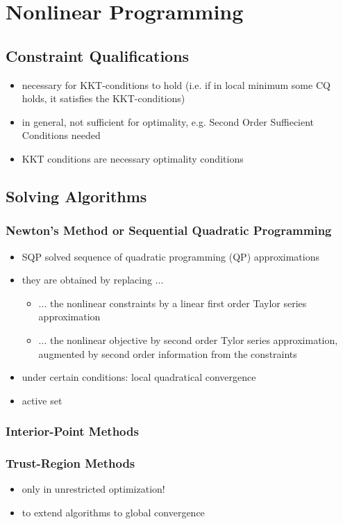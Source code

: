 \documentclass{article}
\begin{document}
\section{Nonlinear Programming}
\subsection{Constraint Qualifications}
\begin{itemize}
\item necessary for KKT-conditions to hold (i.e. if in local minimum some CQ holds, it satisfies the KKT-conditions)
\item in general, not sufficient for optimality, e.g. Second Order Suffiecient Conditions needed
\item KKT conditions are necessary optimality conditions
\end{itemize}

\subsection{Solving Algorithms}
\subsubsection{Newton's Method or Sequential Quadratic Programming}
\begin{itemize}
\item SQP solved sequence of quadratic programming (QP) approximations 
\item they are obtained by replacing ...
	\begin{itemize}
	\item ... the nonlinear constraints by a linear first order Taylor series approximation
	\item ... the nonlinear objective by second order Tylor series approximation, augmented by second order information from the constraints
	\end{itemize}	 
\item under certain conditions: local quadratical convergence
\item active set
\end{itemize}
\subsubsection{Interior-Point Methods}

\subsubsection{Trust-Region Methods}
\begin{itemize}
\item only in unrestricted optimization!
\item to extend algorithms to global convergence
\end{itemize}

{}

\end{document}
